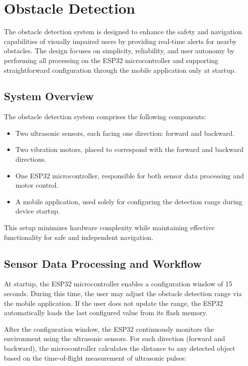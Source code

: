 \section{Obstacle Detection}
\label{Obstacle Detection Methodology Section}

The obstacle detection system is designed to enhance the safety and navigation capabilities of visually impaired users by providing real-time alerts for nearby obstacles. The design focuses on simplicity, reliability, and user autonomy by performing all processing on the ESP32 microcontroller and supporting straightforward configuration through the mobile application only at startup.

\subsection{System Overview}

The obstacle detection system comprises the following components:

\begin{itemize}
	\item Two ultrasonic sensors, each facing one direction: forward and backward.
	\item Two vibration motors, placed to correspond with the forward and backward directions.
	\item One ESP32 microcontroller, responsible for both sensor data processing and motor control.
	\item A mobile application, used solely for configuring the detection range during device startup.
\end{itemize}

This setup minimizes hardware complexity while maintaining effective functionality for safe and independent navigation.

\subsection{Sensor Data Processing and Workflow}

At startup, the ESP32 microcontroller enables a configuration window of 15 seconds. During this time, the user may adjust the obstacle detection range via the mobile application. If the user does not update the range, the ESP32 automatically loads the last configured value from its flash memory.

After the configuration window, the ESP32 continuously monitors the environment using the ultrasonic sensors. For each direction (forward and backward), the microcontroller calculates the distance to any detected object based on the time-of-flight measurement of ultrasonic pulses:

